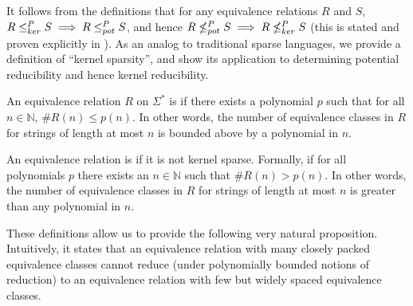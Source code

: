 It follows from the definitions that for any equivalence relations $R$ and $S$, $R\leq^{P}_{ker} S\implies R\leq^{P}_{pot} S$, and hence $R\nleq^{P}_{pot} S \implies R\nleq^{P}_{ker} S$ (this is stated and proven explicitly in \autocite[Lemma~5.5]{bcffm}).
As an analog to traditional sparse languages, we provide a definition of ``kernel sparsity'', and show its application to determining potential reducibility and hence kernel reducibility.

\begin{definition}
  An equivalence relation $R$ on $\Sigma^*$ is  if there exists a polynomial $p$ such that for all $n\in\mathbb{N}$, $\#R(n)\leq p(n)$.
  In other words, the number of equivalence classes in $R$ for strings of length at most $n$ is bounded above by a polynomial in $n$.

  An equivalence relation is  if it is not kernel sparse.
  Formally, if for all polynomials $p$ there exists an $n\in\mathbb{N}$ such that $\#R(n)>p(n)$.
  In other words, the number of equivalence classes in $R$ for strings of length at most $n$ is greater than any polynomial in $n$.
\end{definition}

These definitions allow us to provide the following very natural proposition.
Intuitively, it states that an equivalence relation with many closely packed equivalence classes cannot reduce (under polynomially bounded notions of reduction) to an equivalence relation with few but widely spaced equivalence classes.


